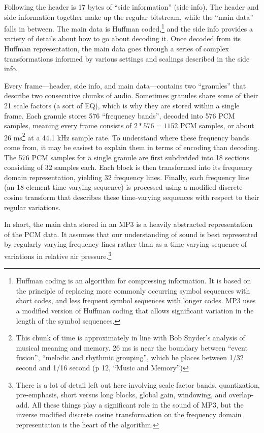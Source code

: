 \documentclass{thesis}
\begin{document}
Following the header is 17 bytes of ``side information'' (side info). The header and side information together make up the regular bitstream, while the ``main data'' falls in between. The main data is Huffman coded,\footnote{Huffman coding is an algorithm for compressing information. It is based on the principle of replacing more commonly occurring symbol sequences with short codes, and less frequent symbol sequences with longer codes. MP3 uses a modified version of Huffman coding that allows significant variation in the length of the symbol sequences.} and the side info provides a variety of details about how to go about decoding it. Once decoded from its Huffman representation, the main data goes through a series of complex transformations informed by various settings and scalings described in the side info.

Every frame---header, side info, and main data---contains two ``granules'' that describe two consecutive chunks of audio. Sometimes granules share some of their 21 scale factors (a sort of EQ), which is why they are stored within a single frame. Each granule stores 576 ``frequency bands'', decoded into 576 PCM samples, meaning every frame consists of $2*576=1152$ PCM samples, or about 26 ms\footnote{This chunk of time is approximately in line with Bob Snyder's analysis of musical meaning and memory. 26 ms is near the boundary between ``event fusion'', ``melodic and rhythmic grouping'', which he places between 1/32 second and 1/16 second (p 12, ``Music and Memory'')} at a 44.1 kHz sample rate. To understand where these frequency bands come from, it may be easiest to explain them in terms of encoding than decoding. The 576 PCM samples for a single granule are first subdivided into 18 sections consisting of 32 samples each. Each block is then transformed into its frequency domain representation, yielding 32 frequency lines. Finally, each frequency line (an 18-element time-varying sequence) is processed using a modified discrete cosine transform that describes these time-varying sequences with respect to their regular variations.

In short, the main data stored in an MP3 is a heavily abstracted representation of the PCM data. It assumes that our understanding of sound is best represented by regularly varying frequency lines rather than as a time-varying sequence of variations in relative air pressure.\footnote{There is a lot of detail left out here involving scale factor bands, quantization, pre-emphasis, short versus long blocks, global gain, windowing, and overlap-add. All these things play a significant role in the sound of MP3, but the inverse modified discrete cosine transformation on the frequency domain representation is the heart of the algorithm.}
\end{document}
